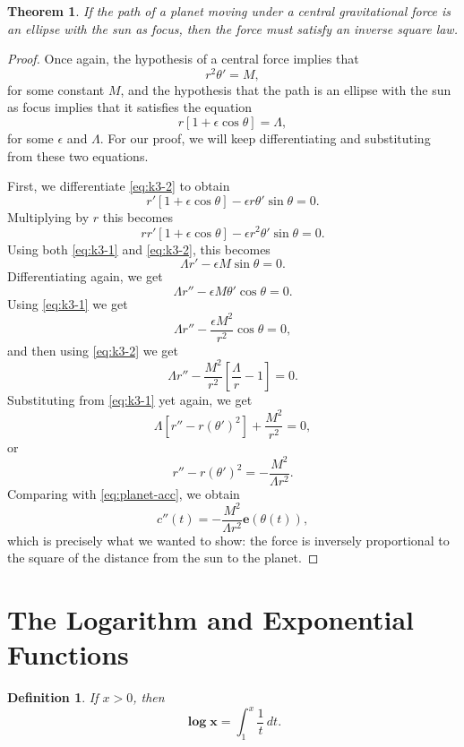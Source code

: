 \documentclass{article}
\numberwithin{corollary}{subsection}
\numberwithin{definition}{subsection}
\newtheorem*{definition*}{Definition}
\numberwithin{lemma}{subsection}
\newtheorem{theorem}{Theorem}
\numberwithin{theorem}{subsection}
\begin{document}
\begin{theorem}
  If the path of a planet moving under a central gravitational force is an
  ellipse with the sun as focus, then the force must satisfy an inverse square
  law.
\end{theorem}
\begin{proof}
  Once again, the hypothesis of a central force implies that
  \begin{equation} \label{eq:k3-1} \tag{$K_2$}
    r^2\theta' = M,
  \end{equation} for some constant $M$, and the hypothesis that the path is an
  ellipse with the sun as focus implies that it satisfies the equation
  \begin{equation} \label{eq:k3-2} \tag{A}
    r[1 + \epsilon \cos \theta] = \Lambda,
  \end{equation} for some $\epsilon$ and $\Lambda$. For our proof, we will keep
  differentiating and substituting from these two equations.

  First, we differentiate \eqref{eq:k3-2} to obtain \[
    r'[1 + \epsilon \cos \theta] - \epsilon r \theta' \sin \theta = 0.
  \] Multiplying by $r$ this becomes \[
    rr'[1 + \epsilon \cos \theta] - \epsilon r^2 \theta' \sin \theta = 0.
  \] Using both \eqref{eq:k3-1} and \eqref{eq:k3-2}, this becomes \[
    \Lambda r' - \epsilon M \sin \theta = 0.
  \] Differentiating again, we get \[
    \Lambda r'' - \epsilon M \theta' \cos \theta = 0.
  \] Using \eqref{eq:k3-1} we get \[
    \Lambda r'' - \frac{\epsilon M^2}{r^2} \cos \theta = 0,
  \] and then using \eqref{eq:k3-2} we get \[
    \Lambda r'' - \frac{M^2}{r^2}\left[\frac{\Lambda}{r} - 1\right] = 0.
  \] Substituting from \eqref{eq:k3-1} yet again, we get \[
    \Lambda[r'' - r(\theta')^2] + \frac{M^2}{r^2} = 0,
  \] or \[
    r'' - r(\theta')^2 = -\frac{M^2}{\Lambda r^2}.
  \] Comparing with \eqref{eq:planet-acc}, we obtain \[
    c''(t) = -\frac{M^2}{\Lambda r^2} \mathbf{e}(\theta(t)),
  \] which is precisely what we wanted to show: the force is inversely
  proportional to the square of the distance from the sun to the planet.
\end{proof}

\section{The Logarithm and Exponential Functions}

\begin{definition*}
  If $x > 0$, then \[ \pmb{\log x} = \int_1^x \frac{1}{t} \,dt. \]
\end{definition*}
\end{document}
